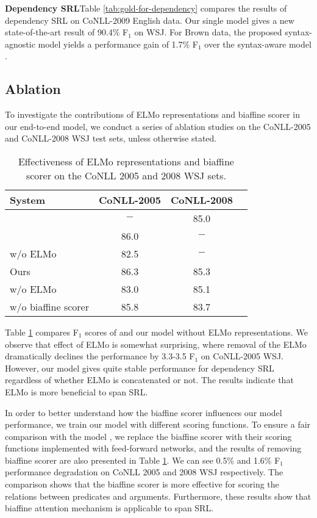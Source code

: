 \documentclass[letterpaper]{article} \usepackage{aaai19}  \usepackage{times}  \usepackage{helvet}  \usepackage{courier}  \usepackage{url}  \usepackage{graphicx}  \frenchspacing  \setlength{\pdfpagewidth}{8.5in}  \setlength{\pdfpageheight}{11in}
\begin{document}
\noindent \textbf{Dependency SRL}\quad Table \ref{tab:gold-for-dependency} compares the results of dependency SRL on CoNLL-2009 English data. Our single model gives a new state-of-the-art result of 90.4\% F$_1$ on WSJ. For Brown data, the proposed syntax-agnostic model yields a performance gain of 1.7\% F$_1$ over the syntax-aware model \cite{li2018unified}.

\subsection{Ablation}
To investigate the contributions of ELMo representations and biaffine scorer in our end-to-end model, we conduct a series of ablation studies on the CoNLL-2005 and CoNLL-2008 WSJ test sets, unless otherwise stated.

\begin{table}
	\centering
\begin{tabular}{lccc}
		\toprule
		System & CoNLL-2005& CoNLL-2008\\
		\midrule
		\citeauthor{cai2018full} \shortcite{cai2018full} & $-$ & 85.0  \\
		\midrule
		\citeauthor{he2018jointly} \shortcite{he2018jointly} & 86.0 & $-$ \\
		w/o ELMo & 82.5 & $-$ \\ 
		\midrule
		Ours & 86.3 & 85.3 \\
		w/o ELMo & 83.0 & 85.1 \\
		w/o biaffine scorer & 85.8 & 83.7 \\
		\bottomrule
	\end{tabular}
	\caption{Effectiveness of ELMo representations and biaffine scorer on the CoNLL 2005 and 2008 WSJ sets.}\label{ablation:elmo}
\end{table}

Table \ref{ablation:elmo} compares F$_1$ scores of \citeauthor{he2018jointly}  and our model without ELMo representations. We observe that effect of ELMo is somewhat surprising, where removal of the ELMo dramatically declines the performance by 3.3-3.5 F$_1$ on CoNLL-2005 WSJ. However, our model gives quite stable performance for dependency SRL regardless of whether ELMo is concatenated or not. The results indicate that ELMo is more beneficial to span SRL.



In order to better understand how the biaffine scorer influences our model performance, we train our model with different scoring functions. To ensure a fair comparison with the model \cite{he2018jointly}, we replace the biaffine scorer with their scoring functions implemented with feed-forward networks, and the results of removing biaffine scorer are also presented in Table \ref{ablation:elmo}. We can see 0.5\% and 1.6\% F$_1$ performance degradation on CoNLL 2005 and 2008 WSJ respectively. The comparison shows that the biaffine scorer is more effective for scoring the relations between predicates and arguments. Furthermore, these results show that biaffine attention mechanism is applicable to span SRL. 
\end{document}
